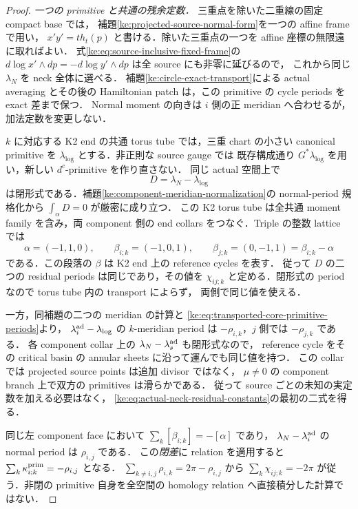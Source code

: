 \begin{proof}
\emph{一つの primitive と共通の残余定数．}
三重点を除いた二重線の固定 compact base では，
補題\ref{ke:projected-source-normal-form}を一つの affine frame で用い，
$x'y'=t h_t(p)$ と書ける．除いた三重点の一つを affine 座標の無限遠に取ればよい．
式\eqref{ke:eq:source-inclusive-fixed-frame}の
$d\log x'\wedge dp=-d\log y'\wedge dp$ は全 source にも非零に延びるので，
これから同じ $\lambda_N$ を neck 全体に選べる．
補題\ref{ke:circle-exact-transport}による actual averaging とその後の
Hamiltonian patch は，この primitive の cycle periods を exact 差まで保つ．
Normal moment の向きは $i$ 側の正 meridian へ合わせるが，加法定数を変更しない．

$k$ に対応する K2 end の共通 torus tube では，三重 chart の小さい
canonical primitive を $\lambda_{\log}$ とする．非正則な source gauge では
既存構成通り $G^*\lambda_{\log}$ を用い，新しい $d^c$-primitive を作り直さない．
同じ actual 空間上で
\[
 D=\lambda_N-\lambda_{\log}
\]
は閉形式である．補題\ref{ke:component-meridian-normalization}の normal-period
規格化から $\int_\alpha D=0$ が厳密に成り立つ．
この K2 torus tube は全共通 moment family を含み，両 component 側の end collars
をつなぐ．Triple の整数 lattice では
\[
 \alpha=(-1,1,0),\qquad
 \beta_{i;k}=(-1,0,1),\qquad
 \beta_{j;k}=(0,-1,1)=\beta_{i;k}-\alpha
\]
である．この段落の $\beta$ は K2 end 上の reference cycles を表す．
従って $D$ の二つの residual periods は同じであり，その値を
$\chi_{ij;k}$ と定める．閉形式の period なので torus tube 内の transport によらず，
両側で同じ値を使える．

一方，同補題の二つの meridian の計算と
\eqref{ke:eq:transported-core-primitive-periods}より，
$\lambda_i^{\rm ad}-\lambda_{\log}$ の $k$-meridian period は
$-\rho_{i,k}$，$j$ 側では $-\rho_{j,k}$ である．
各 component collar 上の $\lambda_N-\lambda_s^{\rm ad}$ も閉形式なので，
reference cycle をその critical basin の annular sheets に沿って運んでも同じ値を持つ．
この collar では projected source points は追加 divisor ではなく，
$\mu\ne0$ の component branch 上で双方の primitives は滑らかである．
従って source ごとの未知の実定数を加える必要はなく，
\eqref{ke:eq:actual-neck-residual-constants}の最初の二式を得る．

同じ左 component face において
$\sum_k[\beta_{i;k}]=-[\alpha]$ であり，
$\lambda_N-\lambda_i^{\rm ad}$ の normal period は $\rho_{i,j}$ である．
この\emph{閉差}に relation を適用すると
$\sum_k\kappa^{\rm prim}_{i;k}=-\rho_{i,j}$ となる．
$\sum_{k\ne i,j}\rho_{i,k}=2\pi-\rho_{i,j}$ から
$\sum_k\chi_{ij;k}=-2\pi$ が従う．非閉の primitive 自身を全空間の
homology relation へ直接積分した計算ではない．


\end{proof}

